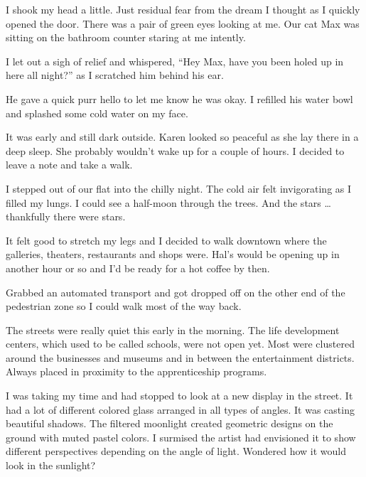 I shook my head a little. Just residual fear from the dream I
thought as I quickly opened the door.  There was a pair of green
eyes looking at me. Our cat Max was sitting on the bathroom
counter staring at me intently.

I let out a sigh of relief and whispered, ``Hey Max, have you
been holed up in here all night?'' as I scratched him behind his
ear.

He gave a quick purr hello to let me know he was okay.  I
refilled his water bowl and splashed some cold water on my
face.

It was early and still dark outside.  Karen looked so peaceful
as she lay there in a deep sleep. She probably wouldn't wake up
for a couple of hours. I decided to leave a note and take a
walk.

I stepped out of our flat into the chilly night. The cold air
felt invigorating as I filled my lungs. I could see a half-moon
through the trees. And the stars \ldots thankfully there were
stars.


It felt good to stretch my legs and I decided to walk downtown
where the galleries, theaters, restaurants and shops were.
Hal's would be opening up in another hour or so and I'd be ready
for a hot coffee by then.

Grabbed an automated transport and got dropped off on the
other end of the pedestrian zone so I could walk most of the way
back.

The streets were really quiet this early in the morning. The
life development centers, which used to be called schools, were
not open yet. Most were clustered around the businesses and
museums and in between the entertainment districts.  Always
placed in proximity to the apprenticeship programs.

I was taking my time and had stopped to look at a new display in
the street. It had a lot of different colored glass arranged in
all types of angles. It was casting beautiful shadows. The
filtered moonlight created geometric designs on the ground with
muted pastel colors.  I surmised the artist had envisioned it to
show different perspectives depending on the angle of light.
Wondered how it would look in the sunlight?



